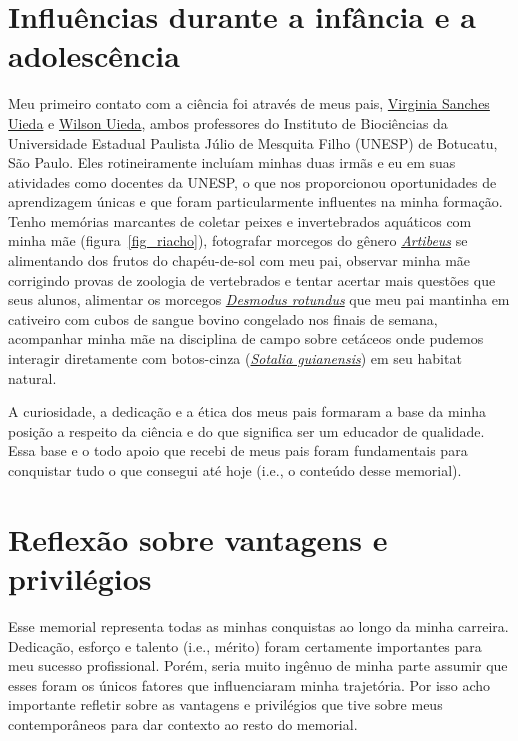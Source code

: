 \documentclass[10pt,a4paper,oneside]{book}
\begin{document}
\section{Influências durante a infância e a adolescência}

Meu primeiro contato com a ciência foi através de meus pais,
\href{https://orcid.org/0000-0002-6078-1342}{Virginia Sanches Uieda} e
\href{https://orcid.org/0000-0002-4177-3339}{Wilson Uieda},
ambos professores do Instituto de Biociências da Universidade Estadual Paulista
Júlio de Mesquita Filho (UNESP) de Botucatu, São Paulo.
Eles rotineiramente incluíam minhas duas irmãs e eu em suas atividades como
docentes da UNESP, o que nos proporcionou oportunidades de aprendizagem únicas
e que foram particularmente influentes na minha formação.
Tenho memórias marcantes de coletar peixes e invertebrados aquáticos com minha
mãe (figura~\ref{fig_riacho}), fotografar morcegos do gênero
\href{https://pt.wikipedia.org/wiki/Artibeus}{\textit{Artibeus}} se alimentando
dos frutos do chapéu-de-sol com meu pai, observar minha mãe corrigindo provas
de zoologia de vertebrados e tentar acertar mais questões que seus alunos,
alimentar os morcegos
\href{https://pt.wikipedia.org/wiki/Desmodus_rotundus}{\textit{Desmodus rotundus}}
que meu pai mantinha em cativeiro com cubos de sangue bovino congelado nos
finais de semana, acompanhar minha mãe na disciplina de campo sobre cetáceos
onde pudemos interagir diretamente com botos-cinza
(\href{https://pt.wikipedia.org/wiki/Sotalia_guianensis}{\textit{Sotalia guianensis}})
em seu habitat natural.

A curiosidade, a dedicação e a ética dos meus pais formaram a base da minha
posição a respeito da ciência e do que significa ser um educador de qualidade.
Essa base e o todo apoio que recebi de meus pais foram fundamentais para
conquistar tudo o que consegui até hoje (i.e., o conteúdo desse memorial).

\section{Reflexão sobre vantagens e privilégios}

Esse memorial representa todas as minhas conquistas ao longo da minha carreira.
Dedicação, esforço e talento (i.e., mérito) foram certamente importantes para
meu sucesso profissional.
Porém, seria muito ingênuo de minha parte assumir que esses foram os únicos
fatores que influenciaram minha trajetória.
Por isso acho importante refletir sobre as vantagens e privilégios que tive
sobre meus contemporâneos para dar contexto ao resto do memorial.
\end{document}
